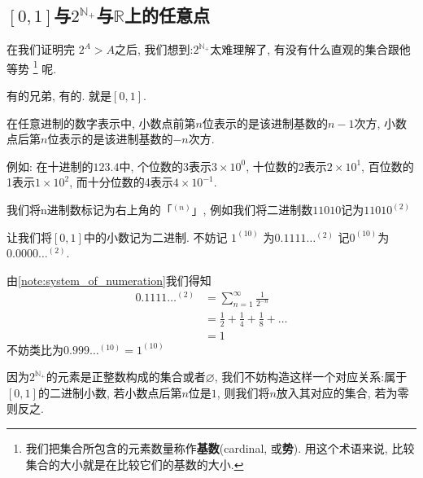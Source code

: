 \subsection{
  \texorpdfstring{$\left[ 0, 1 \right]$与$2^{\mathbb{N}_+}
  $与$\mathbb{R}$上的任意点}{[0, 1]与2\^N+与R上的任意点}
}
在我们证明完 $2^{A}>A$之后, 我们想到:$2^{\mathbb{N}_+} $太难理解了,
有没有什么直观的集合跟他等势
\footnote{我们把集合所包含的元素数量称作\textbf{基数}(cardinal, 或\textbf{势}).
用这个术语来说, 比较集合的大小就是在比较它们的基数的大小. }
呢.

有的兄弟, 有的. 就是$\left[0, 1\right]$.

\begin{note}[任意进制的数字表述] \label{note:system_of_numeration}
  在任意进制的数字表示中,
  小数点前第$n$位表示的是该进制基数的$n-1$次方,
  小数点后第$n$位表示的是该进制基数的$-n$次方.

  例如: 在十进制的$123. 4$中, 个位数的3表示$3 \times 10^{0} $,
  十位数的2表示$2 \times 10^{1} $,
  百位数的1表示$1 \times 10^{2} $,
  而十分位数的4表示$4 \times 10^{-1} $.

  我们将n进制数标记为右上角的「$^{(n)}$」, 例如我们将二进制数$11010$记为$11010^{(2)}$
\end{note}

让我们将$\left[ 0, 1 \right]$中的小数记为二进制.
不妨记 $1^{(10)} $ 为$0. 1111\ldots ^{(2)} $
记$0^{(10)} $为 $0. 0000\ldots ^{(2)} $.

\begin{note}[$0. 1111\ldots ^{(2)}  $等于$1^{(10)}$]
  由\cref{note:system_of_numeration}我们得知
  \begin{align*}
    0. 1111\ldots ^{(2)} & = \sum_{n=1}^{\infty} \frac{1}{2^{-n}}          \\
    & = \frac{1}{2}+\frac{1}{4} +\frac{1}{8} + \ldots \\
    & = 1
  \end{align*}
  不妨类比为$0. 999\ldots ^{(10)} = 1 ^{(10)} $
\end{note}

因为$2^{\mathbb{N}_+} $的元素是正整数构成的集合或者$\varnothing$,
我们不妨构造这样一个对应关系:属于$\left[0, 1\right]$的二进制小数, 若小数点后第$n$位是$1$,
则我们将$n$放入其对应的集合, 若为零则反之.

